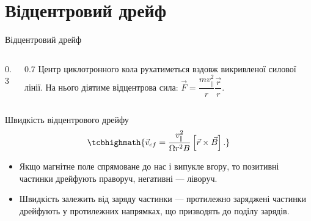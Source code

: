 \documentclass[]{beamer}
\begin{document}
\section{Відцентровий дрейф}




\begin{frame}{Відцентровий дрейф}{}
	\begin{columns}
		\begin{column}{0.3\linewidth}\centering
			
		\end{column}
		\begin{column}{0.7\linewidth}
			Центр циклотронного кола рухатиметься вздовж викривленої силової лінії. На нього діятиме
			відцентрова сила:
			\(
			\vec{F} = \dfrac{mv^2_\parallel}{r} \dfrac{\vec{r}}{r}.
			\)
		\end{column}
	\end{columns}
	\begin{block}{Швидкість відцентрового дрейфу}
		\begin{equation*}
			\tcbhighmath{
				\vec{v}_{cf} = \frac{v^2_\parallel}{\Omega r^2B}\left[ \vec{r}\times\vec{B}\right].
			}
		\end{equation*}
	\end{block}
	\begin{itemize}\justifying
		\item Якщо магнітне поле спрямоване до нас і випукле вгору, то позитивні частинки дрейфують праворуч, негативні --- ліворуч.
		\item Швидкість залежить від заряду частинки --- протилежно заряджені частинки дрейфують у протилежних напрямках, що  призводять до поділу зарядів.
	\end{itemize}
\end{frame}
\end{document}
